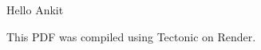 \documentclass{article}
\begin{document}
Hello Ankit 🚀

This PDF was compiled using Tectonic on Render.
\end{document}
